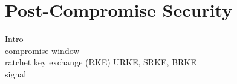 \chapter{Post-Compromise Security} \label{ch:postcomp}
Intro\\compromise window\\
ratchet key exchange (RKE) URKE, SRKE, BRKE\\ signal


